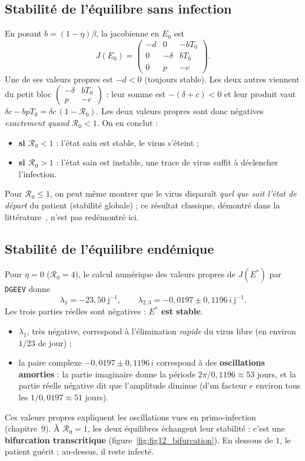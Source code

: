 \documentclass[11pt,a4paper]{report}
\theoremstyle{plain}
\theoremstyle{definition}
\theoremstyle{remark}
\newcommand{\Rzero}{\mathcal{R}_0}
\begin{document}
\subsection*{Stabilité de l'équilibre sans infection}
En posant $b=(1-\eta)\beta$, la jacobienne en $E_0$ est
$$J(E_0)=\begin{pmatrix}-d&0&-bT_0\\0&-\delta&bT_0\\0&p&-c\end{pmatrix}.$$
Une de ses valeurs propres est $-d<0$ (toujours stable). Les deux autres viennent du petit bloc $\begin{pmatrix}-\delta&bT_0\\p&-c\end{pmatrix}$ : leur somme est $-(\delta+c)<0$ et leur produit vaut $\delta c-bpT_0=\delta c\,(1-\Rzero)$. Les deux valeurs propres sont donc négatives \emph{exactement quand} $\Rzero<1$. On en conclut :
\begin{itemize}
    \item \textbf{si $\Rzero<1$} : l'état sain est stable, le virus s'éteint ;
    \item \textbf{si $\Rzero>1$} : l'état sain est instable, une trace de virus suffit à déclencher l'infection.
\end{itemize}
Pour $\Rzero\le1$, on peut même montrer que le virus disparaît \emph{quel que soit l'état de départ} du patient (stabilité globale) ; ce résultat classique, démontré dans la littérature~\cite{korobeinikov2004,deleenheer2003}, n'est pas redémontré ici.

\subsection*{Stabilité de l'équilibre endémique}
Pour $\eta=0$ ($\Rzero=4$), le calcul numérique des valeurs propres de $J(E^*)$ par \texttt{DGEEV} donne
$$\lambda_1=-23{,}50\ \text{j}^{-1},\qquad \lambda_{2,3}=-0{,}0197\pm0{,}1196\,i\ \text{j}^{-1}.$$
Les trois parties réelles sont négatives : \textbf{$E^*$ est stable}.
\begin{itemize}
    \item $\lambda_1$, très négative, correspond à l'élimination \emph{rapide} du virus libre (en environ $1/23$ de jour) ;
    \item la paire complexe $-0{,}0197\pm0{,}1196\,i$ correspond à des \textbf{oscillations amorties} : la partie imaginaire donne la période $2\pi/0{,}1196\approx53$ jours, et la partie réelle négative dit que l'amplitude diminue (d'un facteur $e$ environ tous les $1/0{,}0197\approx51$ jours).
\end{itemize}
Ces valeurs propres expliquent les oscillations vues en primo-infection (chapitre~9). À $\Rzero=1$, les deux équilibres échangent leur stabilité : c'est une \textbf{bifurcation transcritique} (figure~\ref{fig:fig12_bifurcation}). En dessous de $1$, le patient guérit ; au-dessus, il reste infecté.
\end{document}
